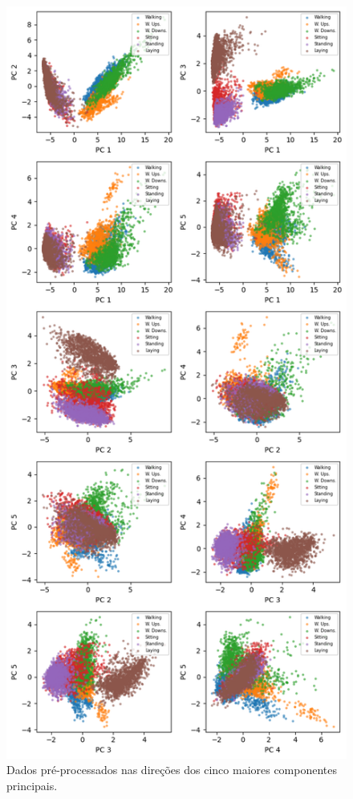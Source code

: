 \documentclass[final,5p]{elsarticle}
\numberwithin{equation}{section}
\begin{document}
        \begin{figure}[hbt!]
            \includegraphics[width=0.95\columnwidth]{C_PrincipalComponents.png}
            \caption{Dados pré-processados nas direções dos cinco maiores componentes principais.}
            \label{fig:pc_preprocessados}
        \end{figure}
\end{document}
